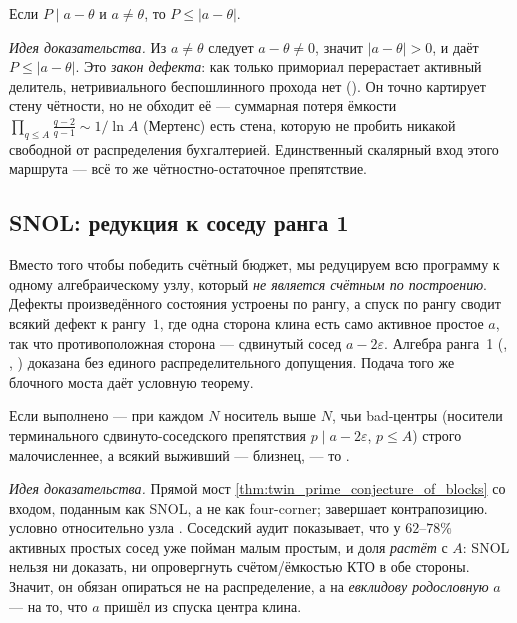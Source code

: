 \begin{theorem}\label{thm:shifted_primorial_bound}
Если $P\mid a-\theta$ и $a\ne\theta$, то $P\le|a-\theta|$.
\end{theorem}

\emph{Идея доказательства.} Из $a\ne\theta$ следует $a-\theta\ne0$, значит $|a-\theta|>0$, и
 даёт $P\le|a-\theta|$. \green{} Это \emph{закон дефекта}: как только примориал
перерастает активный делитель, нетривиального беспошлинного прохода нет
(). Он точно картирует стену чётности, но не обходит её --- суммарная
потеря ёмкости $\prod_{q\le A}\tfrac{q-2}{q-1}\sim 1/\ln A$ (Мертенс) есть стена, которую не пробить
никакой свободной от распределения бухгалтерией. Единственный скалярный вход этого маршрута --- всё
то же чётностно-остаточное препятствие.

\subsection{SNOL: редукция к соседу ранга 1}

Вместо того чтобы победить счётный бюджет, мы редуцируем всю программу к одному алгебраическому
узлу, который \emph{не является счётным по построению}. Дефекты произведённого состояния устроены по
рангу, а спуск по рангу сводит всякий дефект к рангу~$1$, где одна сторона клина есть само активное
простое $a$, так что противоположная сторона --- сдвинутый сосед $a-2\varepsilon$. Алгебра ранга~1
(, , ) доказана
без единого распределительного допущения. Подача того же блочного моста даёт условную теорему.

\begin{theorem}\label{thm:twin_primes_of_SNOL}
Если выполнено  --- при каждом $N$ носитель выше $N$, чьи bad-центры (носители
терминального сдвинуто-соседского препятствия $p\mid a-2\varepsilon$, $p\le A$) строго
малочисленнее, а всякий выживший --- близнец, --- то .
\end{theorem}

\emph{Идея доказательства.} Прямой мост \cref{thm:twin_prime_conjecture_of_blocks} со входом,
поданным как SNOL, а не как four-corner;  завершает контрапозицию.
\green{} условно относительно \red{} узла . Соседский аудит показывает, что у
$62$--$78\%$ активных простых сосед уже пойман малым простым, и доля \emph{растёт} с $A$: SNOL нельзя
ни доказать, ни опровергнуть счётом/ёмкостью КТО в обе стороны. Значит, он обязан опираться не на
распределение, а на \emph{евклидову родословную} $a$ --- на то, что $a$ пришёл из спуска центра
клина.

